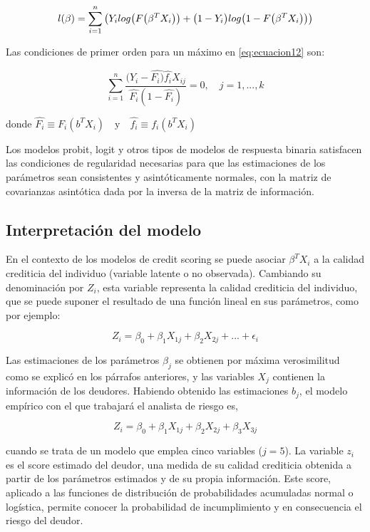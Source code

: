 \documentclass[
  12pt,
]{krantz}
\theoremstyle{definition}
\theoremstyle{definition}
\theoremstyle{definition}
\theoremstyle{remark}
\begin{document}
\[l(\beta)=\sum^{n}_{i=1}\big{(}Y_ilog\big{(}F\big{(}\beta^TX_i\big{)}\big{)}+\big{(}1-Y_i\big{)}log\big{(}1-F\big{(}\beta^TX_i\big{)}\big{)}\big{)}
\label{eq:ecuacion12}\]

Las condiciones de primer orden para un máximo en \eqref{eq:ecuacion12} son:

\[\sum_{i=1}^n\frac{(Y_i-\hat{F_i)}\hat{f_i}X_{ij}}{\hat{F_i}(1-\hat{F_i})}=0,\quad j=1,...,k
\label{eq:ecuacion13}\]

donde \(\hat{F_i}\equiv F_i(b^TX_i) \quad \textrm{y} \quad \hat{f_i}\equiv f_i(b^TX_i)\)

Los modelos probit, logit y otros tipos de modelos de respuesta binaria satisfacen las condiciones de regularidad necesarias para que las estimaciones de los parámetros sean consistentes y asintóticamente normales, con la matriz de covarianzas asintótica dada por la inversa de la matriz de información.

\hypertarget{interpretacion-del-modelo}{%
\subsection{Interpretación del modelo}\label{interpretacion-del-modelo}}

En el contexto de los modelos de credit scoring se puede asociar \(\beta^TX_i\) a la calidad crediticia del individuo (variable latente o no observada). Cambiando su denominación por \(Z_i\), esta variable representa la calidad crediticia del individuo, que se puede suponer el resultado de una función lineal en sus parámetros, como por ejemplo:

\[Z_i=\beta_0+\beta_1X_{1j}+\beta_2X_{2j}+...+\epsilon_i
\label{eq:ecuacion14}\]

Las estimaciones de los parámetros \(\beta_j\) se obtienen por máxima verosimilitud como se explicó en los párrafos anteriores, y las variables \(X_j\) contienen la información de los deudores. Habiendo obtenido las estimaciones \(b_j\), el modelo empírico con el que trabajará el analista de riesgo es,

\[Z_i=\beta_0+\beta_1X_{1j}+\beta_2X_{2j}+\beta_3X_{3j}
\label{eq:ecuacion15}\]

cuando se trata de un modelo que emplea cinco variables (\(j=5\)). La variable \(z_i\) es el score estimado del deudor, una medida de su calidad crediticia obtenida a partir de los parámetros estimados y de su propia información. Este score, aplicado a las funciones de distribución de probabilidades acumuladas normal o logística, permite conocer la probabilidad de incumplimiento y en consecuencia el riesgo del deudor.
\end{document}
